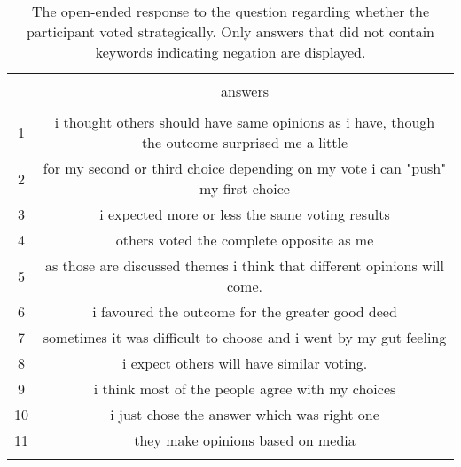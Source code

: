 
\begin{table}[!htbp] \centering 
  \caption{The open-ended response to the question regarding whether the participant voted strategically. Only answers that did not contain keywords indicating negation are displayed.} 
  \label{tab:strategic} 
\begin{tabular}{@{\extracolsep{5pt}} cc} 
\\[-1.8ex]\hline 
\hline \\[-1.8ex] 
 & answers \\ 
\hline \\[-1.8ex] 
1 & i thought others should have same opinions as i have, though the outcome surprised me a little \\ 
2 & for my second or third choice depending on my vote i can "push" my first choice \\ 
3 & i expected more or less the same voting results \\ 
4 & others voted the complete opposite as me \\ 
5 & as those are discussed themes i think that different opinions will come. \\ 
6 & i favoured the outcome for the greater good deed \\ 
7 & sometimes it was difficult to choose and i went by my gut feeling \\ 
8 & i expect others will have similar voting. \\ 
9 & i think most of the people agree with my choices \\ 
10 & i just chose the answer which was right one \\ 
11 & they make opinions based on media \\ 
\hline \\[-1.8ex] 
\end{tabular} 
\end{table} 
